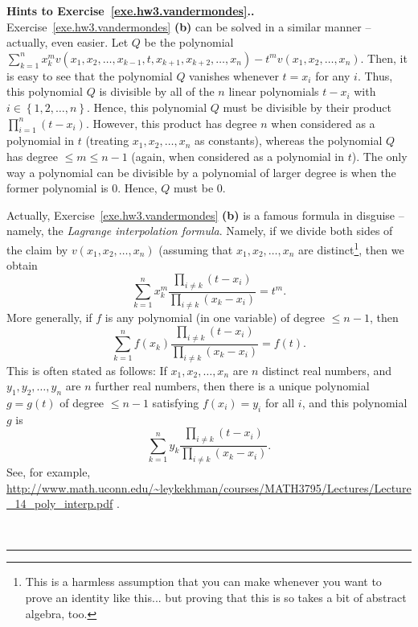 \documentclass[numbers=enddot,12pt,final,onecolumn,notitlepage]{scrartcl}%
\theoremstyle{definition}
\newenvironment{proof}[1][Proof]{\noindent\textbf{#1.} }{\ \rule{0.5em}{0.5em}}
\let\sumnonlimits\sum
\let\prodnonlimits\prod
\renewcommand{\sum}{\sumnonlimits\limits}
\renewcommand{\prod}{\prodnonlimits\limits}
\newcommand{\set}[1]{\left\{ #1 \right\}}
\newcommand{\tup}[1]{\left( #1 \right)}
\begin{document}
\begin{proof}[Hints to Exercise~\ref{exe.hw3.vandermondes}.]
Exercise~\ref{exe.hw3.vandermondes} \textbf{(b)} can be solved in a
similar manner -- actually, even easier. Let $Q$ be the polynomial
$\sum_{k=1}^{n}x_{k}^{m}v\left(  x_{1},x_{2},\ldots,x_{k-1},t,x_{k+1}%
,x_{k+2},\ldots,x_{n}\right)
- t^{m}v\left(  x_{1},x_{2},\ldots,x_{n}\right)$.
Then, it is easy to see that the polynomial $Q$ vanishes whenever
$t = x_i$ for any $i$.
Thus, this polynomial $Q$ is divisible by all of the $n$
linear polynomials $t-x_i$ with $i \in \set{1, 2, \ldots, n}$.
Hence, this polynomial $Q$ must be divisible by their product
$\prod_{i=1}^n \tup{t-x_i}$.
However, this product has degree $n$ when considered as a polynomial
in $t$ (treating $x_1, x_2, \ldots, x_n$ as constants), whereas the
polynomial $Q$ has degree $\leq m \leq n-1$ (again, when considered
as a polynomial in $t$).
The only way a polynomial can be divisible by a polynomial of larger
degree is when the former polynomial is $0$. Hence, $Q$ must be $0$.

Actually,
Exercise~\ref{exe.hw3.vandermondes} \textbf{(b)} is a famous formula
in disguise -- namely, the \textit{Lagrange interpolation formula}.
Namely, if we divide both sides of the claim by
$v \tup{x_1, x_2, \ldots, x_n}$ (assuming that $x_1, x_2, \ldots, x_n$
are distinct\footnote{This is a harmless assumption that you can make
  whenever you want to prove an identity like this... but proving that
  this is so takes a bit of abstract algebra, too.},
then we obtain
\[
\sum_{k=1}^n x_k^m \dfrac{\prod_{i \neq k} \tup{  t - x_i}}
                         {\prod_{i \neq k} \tup{x_k - x_i}}
= t^m .
\]
More generally, if $f$ is any polynomial (in one variable) of degree
$\leq n-1$, then
\[
\sum_{k=1}^n f \tup{x_k} \dfrac{\prod_{i \neq k} \tup{  t - x_i}}
                               {\prod_{i \neq k} \tup{x_k - x_i}}
= f \tup{t} .
\]
This is often stated as follows:
If $x_1, x_2, \ldots, x_n$ are $n$ distinct real numbers, and
$y_1, y_2, \ldots, y_n$ are $n$ further real numbers, then
there is a unique polynomial $g = g \tup{t}$ of degree $\leq n-1$
satisfying $f \tup{x_i} = y_i$ for all $i$, and this polynomial $g$ is
\[
\sum_{k=1}^n y_k \dfrac{\prod_{i \neq k} \tup{  t - x_i}}
                       {\prod_{i \neq k} \tup{x_k - x_i}}
.
\]
See, for example,
\url{http://www.math.uconn.edu/~leykekhman/courses/MATH3795/Lectures/Lecture_14_poly_interp.pdf} .


\end{proof}
\end{document}
